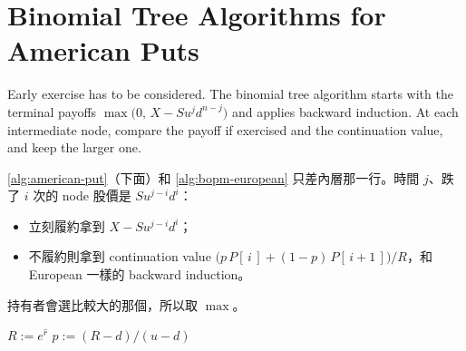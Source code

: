 \section{Binomial Tree Algorithms for American Puts}
\label{sec:american-puts}


Early exercise has to be considered.
The binomial tree algorithm starts with the terminal payoffs $\max\bigl(0,\,X-Su^{j}d^{n-j}\bigr)$ and applies backward induction.
At each intermediate node, compare the payoff if exercised and the continuation value, and keep the larger one.

\suppstart
\begin{remark}
	\autoref{alg:american-put}（下面）和 \autoref{alg:bopm-european} 只差內層那一行。時間 $j$、跌了 $i$ 次的 node 股價是 $Su^{j-i}d^{i}$：
	\begin{itemize}[nosep]
		\item 立刻履約拿到 $X-Su^{j-i}d^{i}$；
		\item 不履約則拿到 continuation value $\bigl(p\,P[\,i\,]+(1-p)\,P[\,i+1\,]\bigr)/R$，和 European 一樣的 backward induction。
	\end{itemize}
	持有者會選比較大的那個，所以取 $\max$。
\end{remark}

\begin{algorithm}[H]
	\caption{Binomial tree algorithm for American puts on a non-dividend-paying stock}
	\label{alg:american-put}
	$R:=e^{\hat{r}}$\;
	$p:=(R-d)/(u-d)$\;
	\;
\end{algorithm}

